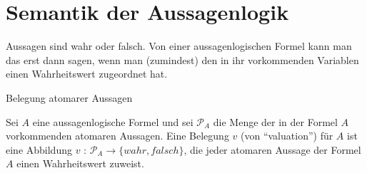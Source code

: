 \section{Semantik der Aussagenlogik}

Aussagen sind wahr oder falsch. Von einer aussagenlogischen Formel kann man das erst dann sagen, wenn man (zumindest) den in ihr vorkommenden Variablen einen Wahrheitswert zugeordnet hat.

\begin{defi} Belegung atomarer Aussagen\cite{Schaefer} \end{defi}Sei  $A$ eine aussagenlogische Formel und sei $\mathcal{P}_A$ die Menge der in der Formel $A$ vorkommenden atomaren Aussagen. Eine Belegung $v$ (von ``valuation'') für $A$ ist eine Abbildung $v$ : $\mathcal{P}_A \rightarrow \{ wahr,falsch \}$, die jeder atomaren Aussage der Formel $A$ einen Wahrheitswert zuweist.


